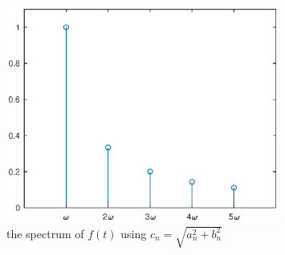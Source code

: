 \begin{figure}[htbp]
  \centering
  \includegraphics[width=0.8\textwidth]{matlab/fig/A_q_4.eps}
  \caption{the spectrum of $f(t)$ using $c_n=\sqrt{a_n^2+b_n^2}$}    
  \label{fig:A_q_4}
\end{figure}

\pagebreak